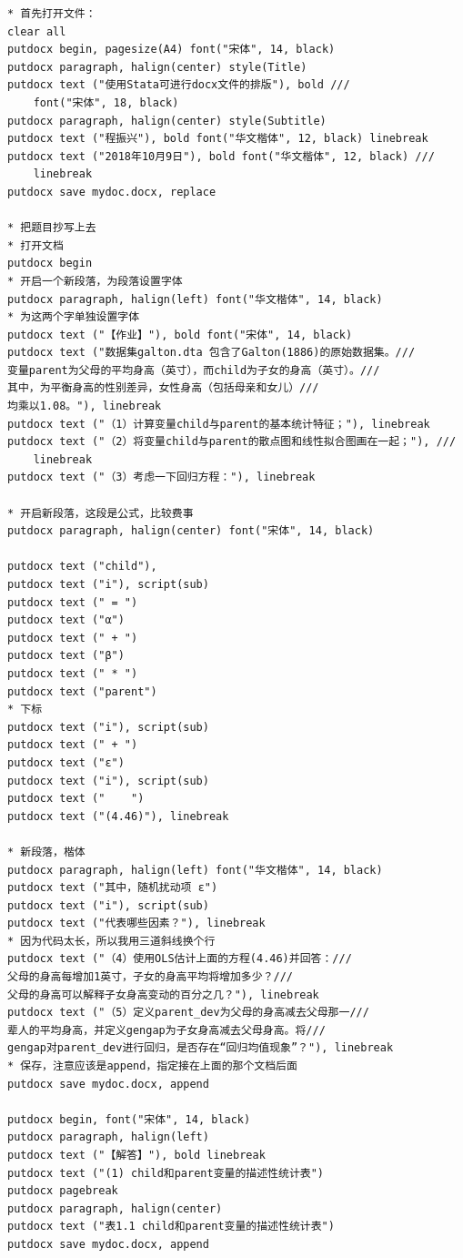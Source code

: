 \documentclass[cn,fancy,blue,11pt]{elegantbook}
\begin{document}
\begin{lstlisting}
* 首先打开文件：
clear all
putdocx begin, pagesize(A4) font("宋体", 14, black)
putdocx paragraph, halign(center) style(Title)
putdocx text ("使用Stata可进行docx文件的排版"), bold ///
    font("宋体", 18, black)
putdocx paragraph, halign(center) style(Subtitle)
putdocx text ("程振兴"), bold font("华文楷体", 12, black) linebreak
putdocx text ("2018年10月9日"), bold font("华文楷体", 12, black) ///
    linebreak
putdocx save mydoc.docx, replace

* 把题目抄写上去
* 打开文档
putdocx begin
* 开启一个新段落，为段落设置字体
putdocx paragraph, halign(left) font("华文楷体", 14, black)
* 为这两个字单独设置字体
putdocx text ("【作业】"), bold font("宋体", 14, black)
putdocx text ("数据集galton.dta 包含了Galton(1886)的原始数据集。///
变量parent为父母的平均身高（英寸），而child为子女的身高（英寸）。///
其中，为平衡身高的性别差异，女性身高（包括母亲和女儿）///
均乘以1.08。"), linebreak
putdocx text ("（1）计算变量child与parent的基本统计特征；"), linebreak
putdocx text ("（2）将变量child与parent的散点图和线性拟合图画在一起；"), ///
    linebreak
putdocx text ("（3）考虑一下回归方程："), linebreak

* 开启新段落，这段是公式，比较费事
putdocx paragraph, halign(center) font("宋体", 14, black)

putdocx text ("child"),
putdocx text ("i"), script(sub)
putdocx text (" = ")
putdocx text ("α")
putdocx text (" + ")
putdocx text ("β")
putdocx text (" * ")
putdocx text ("parent")
* 下标
putdocx text ("i"), script(sub)
putdocx text (" + ")
putdocx text ("ε")
putdocx text ("i"), script(sub)
putdocx text ("    ")
putdocx text ("(4.46)"), linebreak

* 新段落，楷体
putdocx paragraph, halign(left) font("华文楷体", 14, black)
putdocx text ("其中，随机扰动项 ε")
putdocx text ("i"), script(sub)
putdocx text ("代表哪些因素？"), linebreak
* 因为代码太长，所以我用三道斜线换个行
putdocx text ("（4）使用OLS估计上面的方程(4.46)并回答：///
父母的身高每增加1英寸，子女的身高平均将增加多少？///
父母的身高可以解释子女身高变动的百分之几？"), linebreak
putdocx text ("（5）定义parent_dev为父母的身高减去父母那一///
辈人的平均身高，并定义gengap为子女身高减去父母身高。将///
gengap对parent_dev进行回归，是否存在“回归均值现象”？"), linebreak
* 保存，注意应该是append，指定接在上面的那个文档后面
putdocx save mydoc.docx, append

putdocx begin, font("宋体", 14, black)
putdocx paragraph, halign(left)
putdocx text ("【解答】"), bold linebreak
putdocx text ("(1) child和parent变量的描述性统计表")
putdocx pagebreak
putdocx paragraph, halign(center)
putdocx text ("表1.1 child和parent变量的描述性统计表")
putdocx save mydoc.docx, append


\end{lstlisting}
\end{document}
